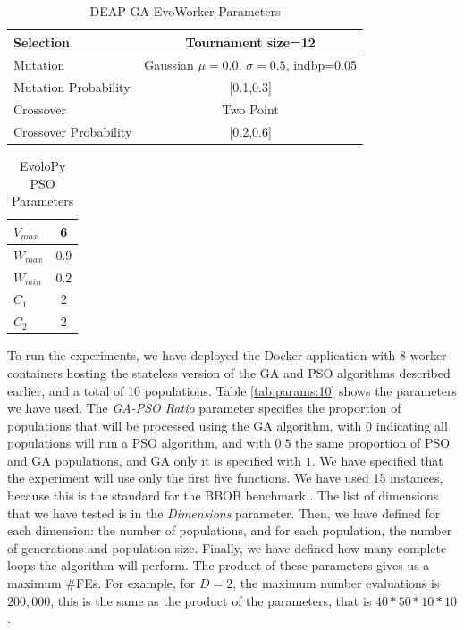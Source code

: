 \documentclass[runningheads]{llncs}
\begin{document}
\begin{table}
  \small
  \caption{ DEAP GA EvoWorker Parameters }
  \label{tab:GAparams} 
  \centering
  \small
  \begin{tabular}{|l|c|}
    \hline
    Selection & Tournament size=12                            \\ \hline
    Mutation & Gaussian $\mu=0.0$, $\sigma=0.5$, indbp=0.05   \\ \hline
    Mutation Probability & [0.1,0.3]                          \\ \hline
    Crossover & Two Point                                     \\ \hline
    Crossover Probability  & [0.2,0.6]                        \\ \hline
  \end{tabular}
\end{table}

\begin{table}
  \small
  \caption{ EvoloPy PSO Parameters }
  \label{tab:PSOparams} 
  \centering
  \small
  \begin{tabular}{|l|c|}
    \hline
    $V_{max}$ & 6 \\ \hline
    $W_{max}$ & $0.9$ \\ \hline
    $W_{min}$ & $0.2$ \\ \hline
    $C_1$ & 2 \\ \hline
    $C_2$ & 2 \\ \hline
  \end{tabular}
\end{table}

To run the experiments, we have deployed the Docker application with 8 worker
containers hosting the stateless version of the GA and PSO algorithms described
earlier, and a total of 10 populations. %
Table \ref{tab:params:10} shows the
parameters we have used. The {\em GA-PSO Ratio} parameter specifies the proportion 
of populations that will be processed using the GA algorithm, with $0$ indicating all populations
will run a PSO algorithm, and with $0.5$ the same proportion of PSO and GA populations, 
and GA only it is specified with $1$. We have specified that the experiment
will use only the first five functions. We have used 15 instances, because 
this is the standard for the BBOB benchmark \cite{hansen2016coco}.
The list of dimensions that we have tested is in the {\em Dimensions} parameter. 
Then, we have defined for each dimension: the number of populations, and for each population,
the number of generations and population size. Finally, we have defined how many complete loops the
algorithm will perform. The product of these parameters gives us a maximum
\#FEs. For example, for $D = 2$, the maximum number evaluations is $200,000$,
this is the same as the product of the parameters, that is $40*50*10*10$. 
\end{document}
